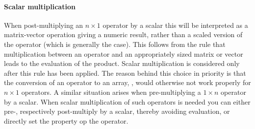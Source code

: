 \paragraph{Scalar multiplication} When post-multiplying an $n\times 1$
\sparco{} operator by a scalar this will be interpreted as a
matrix-vector operation giving a numeric result, rather than a scaled
version of the operator (which is generally the case). This follows
from the rule that multiplication between an operator and an
appropriately sized matrix or vector leads to the evaluation of the
product. Scalar multiplication is considered only after this rule has
been applied. The reason behind this choice in priority is that the
conversion of an operator to an array, , would
otherwise not work properly for $n\times 1$ operators. A similar
situation arises when pre-multiplying a $1\times n$ operator by a
scalar. When scalar multiplication of such operators is needed you can
either pre-, respectively post-multiply by a scalar, thereby avoiding
evaluation, or directly set the  property op the
operator.

